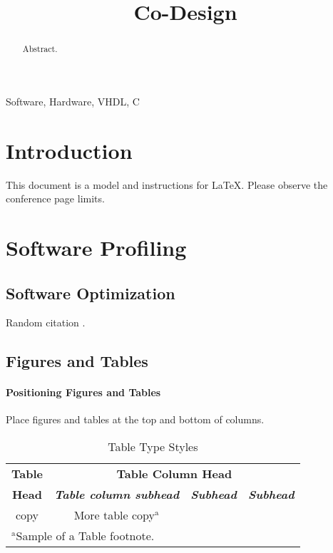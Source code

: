 \documentclass[conference]{IEEEtran}
\begin{document}
\title{Co-Design\\
}

\author{    
        \and
        \and
        \and
}
\maketitle

\begin{abstract}
 Abstract.
\end{abstract}

\begin{IEEEkeywords}
Software, Hardware, VHDL, C
\end{IEEEkeywords}

\section{Introduction}
This document is a model and instructions for \LaTeX.
Please observe the conference page limits. 

\section{Software Profiling}
\subsection{Software Optimization}

Random citation \cite{schaumont2012practical:1}.


\subsection{Figures and Tables}
\paragraph{Positioning Figures and Tables} Place figures and tables at the top and 
bottom of columns.

\begin{table}[htbp]
\caption{Table Type Styles}
\begin{center}
\begin{tabular}{|c|c|c|c|}
\hline
\textbf{Table}&\multicolumn{3}{|c|}{\textbf{Table Column Head}} \\
\cline{2-4} 
\textbf{Head} & \textbf{\textit{Table column subhead}}& \textbf{\textit{Subhead}}& \textbf{\textit{Subhead}} \\
\hline
copy& More table copy$^{\mathrm{a}}$& &  \\
\hline
\multicolumn{4}{l}{$^{\mathrm{a}}$Sample of a Table footnote.}
\end{tabular}
\label{tab1}
\end{center}
\end{table}


 

\end{document}
